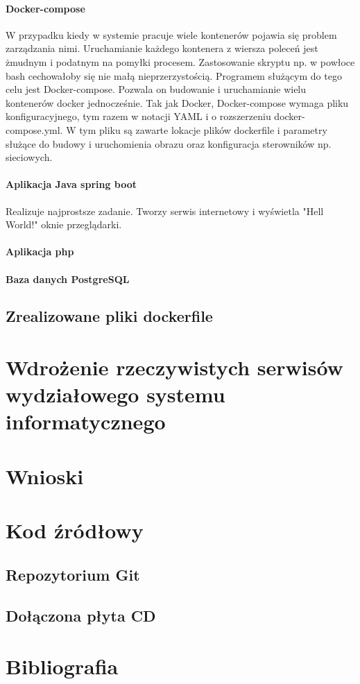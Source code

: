 \documentclass[polish, a4paper, 12pt, oneside]{book}
\begin{document}
\subsubsection{Docker-compose}
W przypadku kiedy w systemie pracuje wiele kontenerów pojawia się problem zarządzania nimi. Uruchamianie każdego kontenera z wiersza poleceń jest żmudnym i podatnym na pomyłki procesem. Zastosowanie skryptu np. w powłoce bash cechowałoby się nie małą nieprzerzystością. Programem służącym do tego celu jest Docker-compose. Pozwala on budowanie i uruchamianie wielu kontenerów docker jednocześnie. Tak jak Docker, Docker-compose wymaga pliku konfiguracyjnego, tym razem w notacji YAML i o rozszerzeniu docker-compose.yml. W tym pliku są zawarte lokacje plików dockerfile i parametry służące do budowy i uruchomienia obrazu oraz konfiguracja sterowników np. sieciowych. 
\subsubsection{Aplikacja Java spring boot}
Realizuje najprostsze zadanie. Tworzy serwis internetowy i wyświetla "Hell World!" oknie przeglądarki.
\subsubsection{Aplikacja php}

\subsubsection{Baza danych PostgreSQL}

\section{Zrealizowane pliki dockerfile}

\chapter{Wdrożenie rzeczywistych serwisów wydziałowego systemu informatycznego}

\chapter{Wnioski}

\chapter{Kod źródłowy}
\section{Repozytorium Git}
\section{Dołączona płyta CD}

\chapter{Bibliografia}
\end{document}
